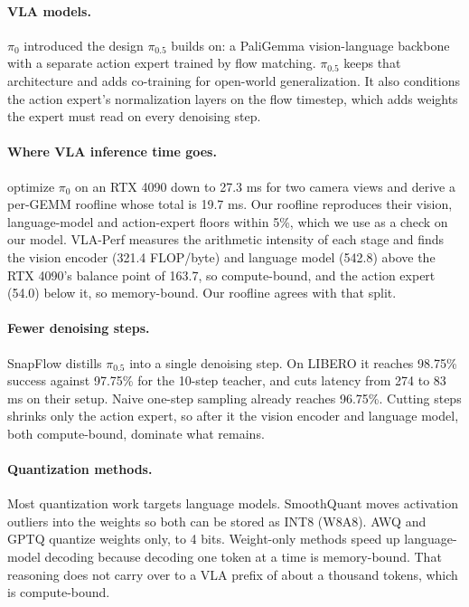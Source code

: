 \documentclass[12pt,letterpaper]{article}
\begin{document}
\paragraph{VLA models.} $\pi_0$ \citep{black2024pi0} introduced the design $\pi_{0.5}$ builds on: a PaliGemma vision-language backbone with a separate action expert trained by flow matching. $\pi_{0.5}$ \citep{intelligence2025pi05} keeps that architecture and adds co-training for open-world generalization. It also conditions the action expert's normalization layers on the flow timestep, which adds weights the expert must read on every denoising step.

\paragraph{Where VLA inference time goes.} \citet{ma2025realtime} optimize $\pi_0$ on an RTX 4090 down to 27.3 ms for two camera views and derive a per-GEMM roofline whose total is 19.7 ms. Our roofline reproduces their vision, language-model and action-expert floors within 5\%, which we use as a check on our model. VLA-Perf \citep{jiang2026vlaperf} measures the arithmetic intensity of each stage and finds the vision encoder (321.4 FLOP/byte) and language model (542.8) above the RTX 4090's balance point of 163.7, so compute-bound, and the action expert (54.0) below it, so memory-bound. Our roofline agrees with that split.

\paragraph{Fewer denoising steps.} SnapFlow \citep{luan2026snapflow} distills $\pi_{0.5}$ into a single denoising step. On LIBERO it reaches 98.75\% success against 97.75\% for the 10-step teacher, and cuts latency from 274 to 83 ms on their setup. Naive one-step sampling already reaches 96.75\%. Cutting steps shrinks only the action expert, so after it the vision encoder and language model, both compute-bound, dominate what remains.

\paragraph{Quantization methods.} Most quantization work targets language models. SmoothQuant \citep{xiao2022smoothquant} moves activation outliers into the weights so both can be stored as INT8 (W8A8). AWQ \citep{lin2023awq} and GPTQ \citep{frantar2022gptq} quantize weights only, to 4 bits. Weight-only methods speed up language-model decoding because decoding one token at a time is memory-bound. That reasoning does not carry over to a VLA prefix of about a thousand tokens, which is compute-bound.
\end{document}
